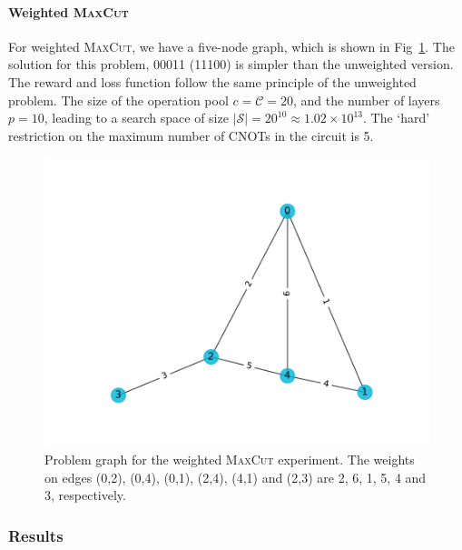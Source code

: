 \documentclass[a4paper,onecolumn,11pt]{quantumarticle}
\begin{document}
\paragraph{Weighted \textsc{MaxCut}} For weighted \textsc{MaxCut}, we have a five-node graph, which is shown in Fig~\ref{fig:max_cut_weighted_prob}. The solution for this problem, 00011 (11100) is simpler than the unweighted version. The reward and loss function follow the same principle of the unweighted problem. The size of the operation pool $c = \mathcal{C} = 20$, and the number of layers $p = 10$, leading to a search space of size $\vert \mathcal{S} \vert = 20^{10} \approx 1.02\times 10^{13}$. The `hard' restriction on the maximum number of CNOTs in the circuit is 5.

\begin{figure}[H]
  \centering
  \includegraphics[width=0.8\linewidth]{Figures/fig_max_cut_weighted_5q.pdf}
  \caption{Problem graph for the weighted \textsc{MaxCut} experiment. The weights on edges (0,2), (0,4), (0,1), (2,4), (4,1) and (2,3) are 2, 6, 1, 5, 4 and 3, respectively.}
  \label{fig:max_cut_weighted_prob}
\end{figure}



\subsubsection{Results}
\end{document}
